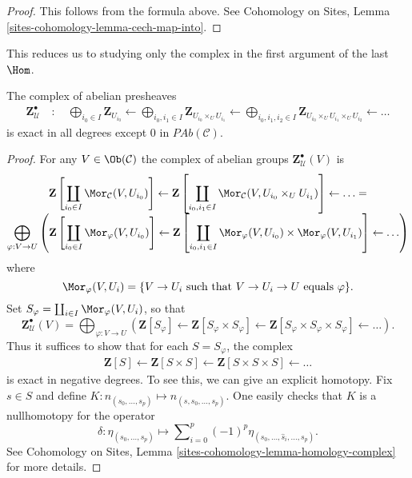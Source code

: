 \begin{proof}
This follows from the formula above. See
Cohomology on Sites, Lemma \ref{sites-cohomology-lemma-cech-map-into}.
\end{proof}

\noindent
This reduces us to studying only the complex in the first argument of the
last $\Hom$.

\begin{lemma}
\label{lemma-exact}
The complex of abelian presheaves
\begin{align*}
\mathbf{Z}_\mathcal{U}^\bullet \quad : \quad
\bigoplus_{i_0 \in I} \mathbf{Z}_{U_{i_0}} \leftarrow
\bigoplus_{i_0, i_1 \in I} \mathbf{Z}_{U_{i_0} \times_U U_{i_1}} \leftarrow
\bigoplus_{i_0, i_1, i_2 \in I}
\mathbf{Z}_{U_{i_0} \times_U U_{i_1} \times_U U_{i_2}} \leftarrow
\ldots
\end{align*}
is exact in all degrees except $0$ in $\textit{PAb}(\mathcal{C})$.
\end{lemma}

\begin{proof}
For any $V\in \Ob(\mathcal{C})$ the complex of abelian groups
$\mathbf{Z}_\mathcal{U}^\bullet(V)$ is
$$
\begin{matrix}
\displaystyle
\mathbf{Z}\left[
\coprod_{i_0\in I} \Mor_\mathcal{C}(V, U_{i_0})\right]
\leftarrow
\mathbf{Z}\left[
\coprod_{i_0, i_1 \in I}
\Mor_\mathcal{C}(V, U_{i_0} \times_U U_{i_1})\right]
\leftarrow \ldots = \\
\displaystyle
\bigoplus_{\varphi: V \to U}
\left(
\mathbf{Z}\left[\coprod_{i_0 \in I} \Mor_\varphi(V, U_{i_0})\right]
\leftarrow
\mathbf{Z}\left[\coprod_{i_0, i_1\in I} \Mor_\varphi(V, U_{i_0}) \times
\Mor_\varphi(V, U_{i_1})\right]
\leftarrow
\ldots
\right)
\end{matrix}
$$
where
$$
\Mor_{\varphi}(V, U_i)
=
\{ V \to U_i \text{ such that } V \to U_i \to U \text{ equals } \varphi \}.
$$
Set $S_\varphi = \coprod_{i\in I} \Mor_\varphi(V, U_i)$, so that
$$
\mathbf{Z}_\mathcal{U}^\bullet(V)
=
\bigoplus_{\varphi: V \to U}
\left(
\mathbf{Z}[S_\varphi] \leftarrow
\mathbf{Z}[S_\varphi \times S_\varphi] \leftarrow
\mathbf{Z}[S_\varphi \times S_\varphi \times S_\varphi] \leftarrow
\ldots \right).
$$
Thus it suffices to show that for each $S = S_\varphi$, the complex
\begin{align*}
\mathbf{Z}[S] \leftarrow
\mathbf{Z}[S \times S] \leftarrow
\mathbf{Z}[S \times S \times S] \leftarrow \ldots
\end{align*}
is exact in negative degrees. To see this, we can give an explicit homotopy.
Fix $s\in S$ and define $K: n_{(s_0, \ldots, s_p)} \mapsto n_{(s, s_0,
\ldots, s_p)}.$ One easily checks that $K$ is a nullhomotopy for the operator
$$
\delta :
\eta_{(s_0, \ldots, s_p)}
\mapsto
\sum\nolimits_{i=0}^p (-1)^p \eta_{(s_0, \ldots, \hat s_i, \ldots, s_p)}.
$$
See
Cohomology on Sites, Lemma \ref{sites-cohomology-lemma-homology-complex}
for more details.
\end{proof}

